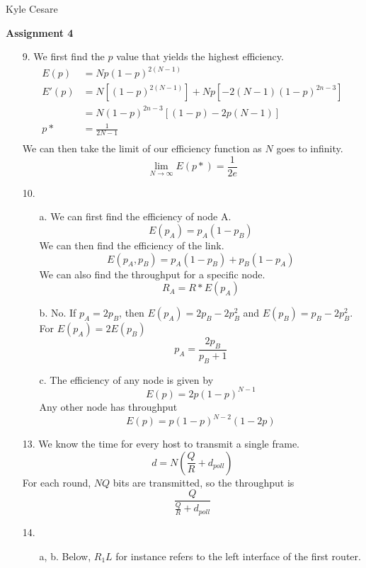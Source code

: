 \documentclass[11pt]{article}
\begin{document}
\begin{flushright}
  Kyle Cesare
\end{flushright}

{\center \textbf{Assignment 4} \\}

\begin{itemize}
  \item[9.] We first find the $p$ value that yields the highest efficiency.
    \begin{align*}
      E(p) &= Np(1-p)^{2(N-1)} \\
      E'(p) &= N[(1-p)^{2(N-1)}] + Np[-2(N-1)(1-p)^{2n-3}] \\
            &= N(1-p)^{2n-3}[(1-p) - 2p(N-1)] \\
      p* &= \frac{1}{2N-1} \\
    \end{align*}
    We can then take the limit of our efficiency function as $N$ goes to
    infinity.
    \[ \lim_{N \to \infty} E(p*) = \frac{1}{2e} \]
  \item[10.]
    \begin{itemize}
      \item[a.] We can first find the efficiency of node A.
        \[ E(p_A) = p_A(1-p_B) \]
        We can then find the efficiency of the link.
        \[ E(p_A, p_B) = p_A(1-p_B) + p_B(1-p_A) \]
        We can also find the throughput for a specific node.
        \[ R_A = R * E(p_A) \]
      \item[b.] No.  If $p_A = 2p_B$, then $E(p_A) = 2p_B - 2p_B^2$ and
        $E(p_B) = p_B - 2p_B^2$. For $E(p_A) = 2E(p_B)$
        \[ p_A = \frac{2p_B}{p_B + 1} \]
      \item[c.] The efficiency of any node is given by
        \[ E(p) = 2p(1-p)^{N-1} \]
        Any other node has throughput
        \[ E(p) = p(1-p)^{N-2}(1-2p) \]
    \end{itemize}
  \item[13.] We know the time for every host to transmit a single frame.
        \[ d = N(\frac{Q}{R} + d_{poll}) \]
        For each round, $NQ$ bits are transmitted, so the throughput is
        \[ \frac{Q}{\frac{Q}{R} + d_{poll}} \]
  \item[14.]
    \begin{itemize}
      \item[a, b.] Below, $R_1L$ for instance refers to the left interface of
                   the first router. \\
        \begin{tabular}{ l | l | l }

\end{tabular}
\end{itemize}
\end{itemize}
\end{document}
